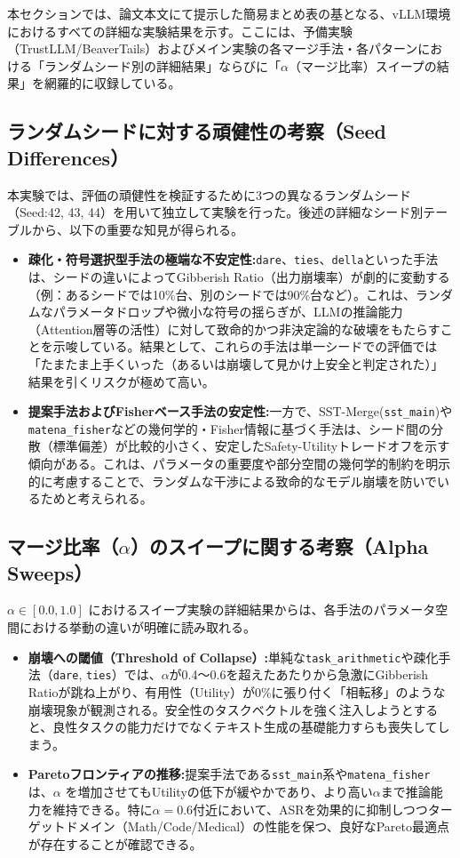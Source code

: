 \documentclass{article}
\begin{document}
本セクションでは、論文本文にて提示した簡易まとめ表の基となる、vLLM環境におけるすべての詳細な実験結果を示す。ここには、予備実験（TrustLLM/BeaverTails）およびメイン実験の各マージ手法・各パターンにおける「ランダムシード別の詳細結果」ならびに「$\alpha$（マージ比率）スイープの結果」を網羅的に収録している。

\subsection{ランダムシードに対する頑健性の考察（Seed Differences）}
本実験では、評価の頑健性を検証するために3つの異なるランダムシード（Seed:42, 43, 44）を用いて独立して実験を行った。後述の詳細なシード別テーブルから、以下の重要な知見が得られる。

\begin{itemize}
    \item \textbf{疎化・符号選択型手法の極端な不安定性:}\texttt{dare}、\texttt{ties}、\texttt{della}といった手法は、シードの違いによってGibberish Ratio（出力崩壊率）が劇的に変動する（例：あるシードでは10\%台、別のシードでは90\%台など）。これは、ランダムなパラメータドロップや微小な符号の揺らぎが、LLMの推論能力（Attention層等の活性）に対して致命的かつ非決定論的な破壊をもたらすことを示唆している。結果として、これらの手法は単一シードでの評価では「たまたま上手くいった（あるいは崩壊して見かけ上安全と判定された）」結果を引くリスクが極めて高い。
    \item \textbf{提案手法およびFisherベース手法の安定性:}一方で、SST-Merge(\texttt{sst\_main})や\texttt{matena\_fisher}などの幾何学的・Fisher情報に基づく手法は、シード間の分散（標準偏差）が比較的小さく、安定したSafety-Utilityトレードオフを示す傾向がある。これは、パラメータの重要度や部分空間の幾何学的制約を明示的に考慮することで、ランダムな干渉による致命的なモデル崩壊を防いでいるためと考えられる。
\end{itemize}

\subsection{マージ比率（$\alpha$）のスイープに関する考察（Alpha Sweeps）}
$\alpha \in [0.0, 1.0]$ におけるスイープ実験の詳細結果からは、各手法のパラメータ空間における挙動の違いが明確に読み取れる。

\begin{itemize}
    \item \textbf{崩壊への閾値（Threshold of Collapse）:}単純な\texttt{task\_arithmetic}や疎化手法（\texttt{dare}, \texttt{ties}）では、$\alpha$が0.4〜0.6を超えたあたりから急激にGibberish Ratioが跳ね上がり、有用性（Utility）が0\%に張り付く「相転移」のような崩壊現象が観測される。安全性のタスクベクトルを強く注入しようとすると、良性タスクの能力だけでなくテキスト生成の基礎能力すらも喪失してしまう。
    \item \textbf{Paretoフロンティアの推移:}提案手法である\texttt{sst\_main}系や\texttt{matena\_fisher}は、$\alpha$ を増加させてもUtilityの低下が緩やかであり、より高い$\alpha$まで推論能力を維持できる。特に$\alpha=0.6$付近において、ASRを効果的に抑制しつつターゲットドメイン（Math/Code/Medical）の性能を保つ、良好なPareto最適点が存在することが確認できる。
\end{itemize}
\end{document}
